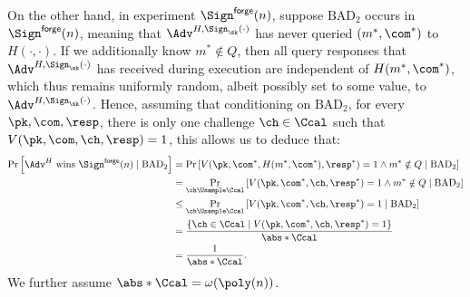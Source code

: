 \begin{answer}
    On the other hand, in experiment $\Sign^{\mathsf{forge}}(n)$, suppose $\textrm{BAD}_2$ occurs in $\Sign^{\mathsf{forge}}(n)$, meaning that $\Adv^{H,\Sign_\sk(\cdot)}$ has never queried $(m^\ast, \com^\ast)$ to $H(\cdot, \cdot)$. If we additionally know $m^\ast\notin Q$, then all query responses that $\Adv^{H,\Sign_\sk(\cdot)}$ has received during execution are independent of $H(m^\ast, \com^\ast)$, which thus remains uniformly random, albeit possibly set to some value, to  $\Adv^{H,\Sign_\sk(\cdot)}$. Hence, assuming that conditioning on $\textrm{BAD}_2$, for every $\pk, \com, \resp$, there is only one challenge $\ch\in\Ccal$ such that $V(\pk, \com, \ch, \resp)=1$, this allows us to deduce that: 
    \begin{align}\label{eq:p2-6}
        \Pr\left[\Adv^H \textrm{ wins } \Sign^{\mathsf{forge}}(n)\mid \textrm{BAD}_2\right]
        &= \Pr\left[ V(\pk, \com^\ast, H(m^\ast, \com^\ast), \resp^\ast)=1 \land m^\ast\notin Q \mid \textrm{BAD}_2\right] \notag\\
        &= \Pr_{\ch\Usample \Ccal}\left[ V(\pk, \com^\ast, \ch, \resp^\ast)=1 \land m^\ast\notin Q\mid \textrm{BAD}_2\right] \notag\\
        &\le \Pr_{\ch\Usample \Ccal}\left[ V(\pk, \com^\ast, \ch, \resp^\ast)=1\mid \textrm{BAD}_2\right] \notag\\
        &= \frac{\{\ch\in\Ccal \mid V(\pk, \com^\ast, \ch, \resp^\ast)=1 \}}{\abs*{\Ccal}} \notag\\
        &= \frac{1}{\abs*{\Ccal}}.
    \end{align}
    We further assume $\abs*{\Ccal} = \omega(\poly(n))$.


\end{answer}
